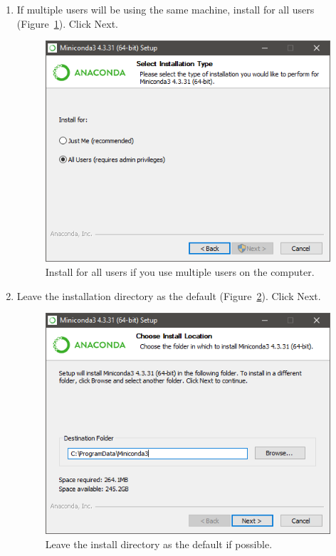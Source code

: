 \documentclass[11pt,a4paper]{article}
\begin{document}
\begin{enumerate}
\item If multiple users will be using the same machine, install for all users (Figure~\ref{fig:miniconda_install_users}). Click Next.
	\begin{figure}[H]
	\centering
	\includegraphics[scale=0.8]{miniconda_install_users.PNG}
	\caption{Install for all users if you use multiple users on the computer.}
	\label{fig:miniconda_install_users}
	\end{figure}

\newpage
\item Leave the installation directory as the default (Figure~\ref{fig:miniconda_install_dir}). Click Next.
	\begin{figure}[H]
	\centering
	\includegraphics[scale=0.8]{miniconda_install_dir.PNG}
	\caption{Leave the install directory as the default if possible.}
	\label{fig:miniconda_install_dir}
	\end{figure}



\end{enumerate}
\end{document}
